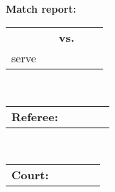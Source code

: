 \documentclass[
	a4paper,
	headinclude=false,
	footinclude=false,
	]{scrartcl}
\begin{document}
	\begin{center}
	   \huge{\textbf{\tournamentname}}\\
	   \vspace{1.25em}
	   \setlength{\ULdepth}{3pt}
	   \LARGE{\textbf{Match report: \uline{$\text{~~~~}$}}}\\
	   \vspace{1.5em}
	   \Large{
	       \renewcommand{\arraystretch}{0.8}
	       \begin{tabular}{@{}R{0.394\textwidth}@{}C{.25em}@{}C{.075\textwidth}@{}C{.25em}@{}L{.394\textwidth}@{}}
	             && \textbf{vs.} &&  \\[-.1em]
	            \small{serve}
	       \end{tabular}
	   }\\[1.5em]
	   \large{
	       \renewcommand{\arraystretch}{0.7}
	       \begin{tabular}{@{}L{.128\textwidth}@{}C{.25em}@{}L{.394\textwidth}@{}C{.25em}@{}L{.347\textwidth}@{}}%
	            \textbf{Referee:} &&  && \\
	       \end{tabular}\\[1.25em]
	       \begin{tabular}{@{}L{.128\textwidth}@{}C{.25em}@{}C{.044\textwidth}@{}C{.25em}@{}L{.697\textwidth}@{}}%
	        \textbf{Court:} &&  && \\
	       \end{tabular}
	   }
	\end{center}
	\vspace{-.5em}
\end{document}

